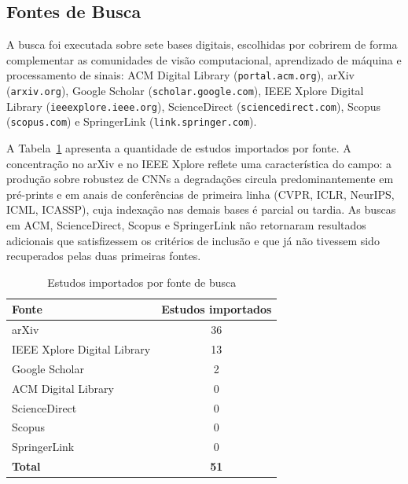 \documentclass[conference]{IEEEtran}
\begin{document}
\subsection{Fontes de Busca}
\label{sec:fb}

A busca foi executada sobre sete bases digitais, escolhidas por cobrirem de
forma complementar as comunidades de visão computacional, aprendizado de
máquina e processamento de sinais: ACM Digital Library
(\texttt{portal.acm.org}), arXiv (\texttt{arxiv.org}), Google Scholar
(\texttt{scholar.google.com}), IEEE Xplore Digital Library
(\texttt{ieeexplore.ieee.org}), ScienceDirect (\texttt{sciencedirect.com}),
Scopus (\texttt{scopus.com}) e SpringerLink (\texttt{link.springer.com}).

A Tabela~\ref{tab:fontes} apresenta a quantidade de estudos importados por
fonte. A concentração no arXiv e no IEEE Xplore reflete uma característica do
campo: a produção sobre robustez de CNNs a degradações circula
predominantemente em pré-prints e em anais de conferências de primeira linha
(CVPR, ICLR, NeurIPS, ICML, ICASSP), cuja indexação nas demais bases é parcial
ou tardia. As buscas em ACM, ScienceDirect, Scopus e SpringerLink não
retornaram resultados adicionais que satisfizessem os critérios de inclusão e
que já não tivessem sido recuperados pelas duas primeiras fontes.

\begin{table}[htbp]
\caption{Estudos importados por fonte de busca}
\begin{center}
\begin{tabular}{|l|c|}
\hline
\textbf{Fonte} & \textbf{Estudos importados} \\
\hline
arXiv & 36 \\
IEEE Xplore Digital Library & 13 \\
Google Scholar & 2 \\
ACM Digital Library & 0 \\
ScienceDirect & 0 \\
Scopus & 0 \\
SpringerLink & 0 \\
\hline
\textbf{Total} & \textbf{51} \\
\hline
\end{tabular}
\label{tab:fontes}
\end{center}
\end{table}
\end{document}
